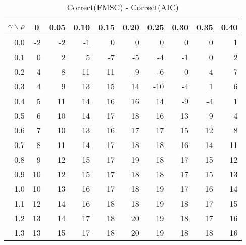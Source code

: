 \documentclass[12pt]{article}
\begin{document}
%
\begin{table}[!tbp]
\caption{Correct(FMSC) - Correct(AIC)}
 \begin{center}
 \begin{tabular}{r|rrrrrrrrr}\hline\hline
\multicolumn{1}{c|}{$\gamma\backslash\rho$}&\multicolumn{1}{c}{0}&\multicolumn{1}{c}{0.05}&\multicolumn{1}{c}{0.10}&\multicolumn{1}{c}{0.15}&\multicolumn{1}{c}{0.20}&\multicolumn{1}{c}{0.25}&\multicolumn{1}{c}{0.30}&\multicolumn{1}{c}{0.35}&\multicolumn{1}{c}{0.40}\tabularnewline
\hline



0.0&-2&-2&-1& 0& 0&  0& 0& 0& 1\tabularnewline
0.1& 0& 2& 5&-7&-5& -4&-1& 0& 2\tabularnewline
0.2& 4& 8&11&11&-9& -6& 0& 4& 7\tabularnewline
0.3& 4& 9&13&15&14&-10&-4& 1& 6\tabularnewline
0.4& 5&11&14&16&16& 14&-9&-4& 1\tabularnewline
0.5& 6&10&14&17&18& 16&13&-9&-4\tabularnewline
0.6& 7&10&13&16&17& 17&15&12& 8\tabularnewline
0.7& 8&11&14&17&18& 18&16&14&11\tabularnewline
0.8& 9&12&15&17&19& 18&17&15&12\tabularnewline
0.9&10&12&15&17&18& 18&17&15&13\tabularnewline
1.0&10&13&16&17&18& 19&17&16&14\tabularnewline
1.1&12&14&16&18&18& 19&18&17&15\tabularnewline
1.2&13&14&17&18&20& 19&18&17&16\tabularnewline
1.3&13&15&17&18&20& 19&18&18&16\tabularnewline
\hline
\end{tabular}

\end{center}

\end{table}
\end{document}
